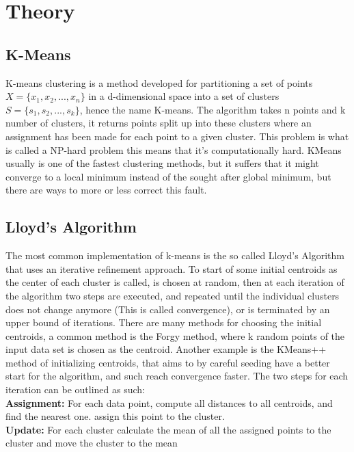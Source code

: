 \documentclass[12pt]{report}
\begin{document}
\chapter{Theory}
\label{sec:label}

\section{K-Means}
\label{subsec:kmeans}

K-means clustering is a method developed for partitioning a set of points $X = \{x_1, x_2, ..., x_n\}$ in a d-dimensional space into a set of clusters $S = \{s_1, s_2, ..., s_k\}$, hence the name K-means. The algorithm takes n points and k number of clusters, it returns points split up into these clusters where an assignment has been made for each point to a given cluster. This problem is what is called a NP-hard problem this means that it's computationally hard. KMeans usually is one of the fastest clustering methods, but it suffers that it might converge to a local minimum instead of the sought after global minimum, but there are ways to more or less correct this fault.\cite{lloyd}

\section{Lloyd's Algorithm}
\label{subsec:lloyds}

The most common implementation of k-means is the so called Lloyd's Algorithm that uses an iterative refinement approach. To start of some initial centroids as the center of each cluster is called, is chosen at random, then at each iteration of the algorithm two steps are executed, and repeated until the individual clusters does not change anymore (This is called convergence), or is terminated by an upper bound of iterations. There are many methods for choosing the initial centroids, a common method is the Forgy method, where k random points of the input data set is chosen as the centroid. Another example is the KMeans++ method of initializing centroids, that aims to by careful seeding have a better start for the algorithm, and such reach convergence faster.\cite{plusplus} The two steps for each iteration can be outlined as such: \\

\textbf{Assignment:} For each data point, compute all distances to all centroids, and find the nearest one. assign this point to the cluster.\\
\textbf{Update:} For each cluster calculate the mean of all the assigned points to the cluster and move the cluster to the mean\\ \\
\end{document}
